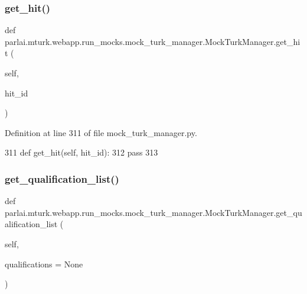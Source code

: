 \subsubsection{\texorpdfstring{get\+\_\+hit()}{get\_hit()}}
{\footnotesize\ttfamily def parlai.\+mturk.\+webapp.\+run\+\_\+mocks.\+mock\+\_\+turk\+\_\+manager.\+Mock\+Turk\+Manager.\+get\+\_\+hit (\begin{DoxyParamCaption}\item[{}]{self,  }\item[{}]{hit\+\_\+id }\end{DoxyParamCaption})}



Definition at line 311 of file mock\+\_\+turk\+\_\+manager.\+py.


\begin{DoxyCode}
311     \textcolor{keyword}{def }get\_hit(self, hit\_id):
312         \textcolor{keywordflow}{pass}
313 
\end{DoxyCode}
\mbox{\label{classparlai_1_1mturk_1_1webapp_1_1run__mocks_1_1mock__turk__manager_1_1MockTurkManager_a54fefa6a8fbd69f12f8ed7c3728c7c34}} 
\subsubsection{\texorpdfstring{get\+\_\+qualification\+\_\+list()}{get\_qualification\_list()}}
{\footnotesize\ttfamily def parlai.\+mturk.\+webapp.\+run\+\_\+mocks.\+mock\+\_\+turk\+\_\+manager.\+Mock\+Turk\+Manager.\+get\+\_\+qualification\+\_\+list (\begin{DoxyParamCaption}\item[{}]{self,  }\item[{}]{qualifications = {\ttfamily None} }\end{DoxyParamCaption})}



